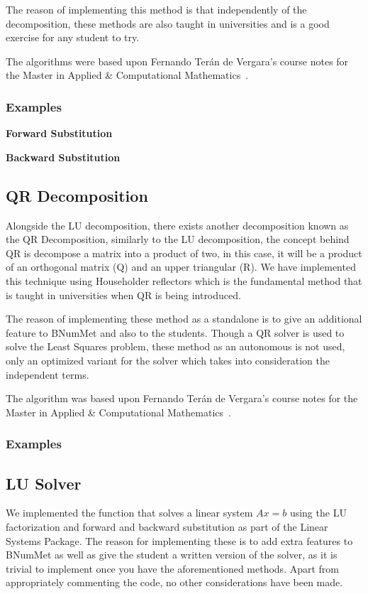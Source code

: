 The reason of implementing this method is that independently of the decomposition, these methods are also taught in universities and is a good exercise for any student to try.

The algorithms were based upon Fernando Terán de Vergara's course notes for the Master in Applied \& Computational Mathematics~\cite{Vergara}.
\subsubsection{Examples}
\textbf{Forward Substitution}
	
 \textbf{Backward Substitution}
	
\subsection{QR Decomposition}
Alongside the LU decomposition, there exists another decomposition known as the QR Decomposition, similarly to the LU decomposition, the concept behind QR is decompose a matrix into a product of two, in this case, it will be a product of an orthogonal matrix (Q) and an upper triangular (R). We have implemented this technique using Householder reflectors which is the fundamental method that is taught in universities when QR is being introduced.

The reason of implementing these method as a standalone is to give an additional feature to BNumMet and also to the students. Though a QR solver is used to solve the Least Squares problem, these method as an autonomous is not used, only an optimized variant for the solver which takes into consideration the independent terms.

The algorithm was based upon Fernando Terán de Vergara's course notes for the Master in Applied \& Computational Mathematics~\cite{Vergara}.
\subsubsection{Examples}


\subsection{LU Solver}
We implemented the function that solves a linear system $Ax=b$ using the LU factorization and forward and backward substitution as part of the Linear Systems Package. The reason for implementing these is to add extra features to BNumMet as well as give the student a written version of the solver, as it is trivial to implement once you have the aforementioned methods. Apart from appropriately commenting the code, no other considerations have been made.
